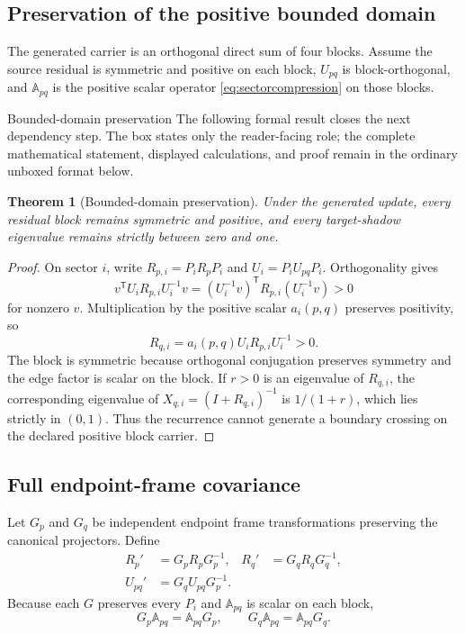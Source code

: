 \documentclass[11pt]{article}
\numberwithin{equation}{section}
\newtheorem{theorem}[definition]{Theorem}
\theoremstyle{remark}
\begin{document}
\subsection{Preservation of the positive bounded domain}
The generated carrier is an orthogonal direct sum of four blocks.  Assume the source residual is symmetric and positive on each block, $U_{pq}$ is block-orthogonal, and $\mathbb A_{pq}$ is the positive scalar operator \eqref{eq:sectorcompression} on those blocks.

\begin{proofguide}{Bounded-domain preservation}
The following formal result closes the next dependency step. The box states only the reader-facing role; the complete mathematical statement, displayed calculations, and proof remain in the ordinary unboxed format below.
\end{proofguide}
\begin{theorem}[Bounded-domain preservation]
Under the generated update, every residual block remains symmetric and positive, and every target-shadow eigenvalue remains strictly between zero and one.
\end{theorem}
\begin{proof}
On sector $i$, write $R_{p,i}=P_iR_pP_i$ and $U_i=P_iU_{pq}P_i$.  Orthogonality gives
\begin{equation}
v^{\mathsf T}U_iR_{p,i}U_i^{-1}v=(U_i^{-1}v)^{\mathsf T}R_{p,i}(U_i^{-1}v)>0
\end{equation}
for nonzero $v$.  Multiplication by the positive scalar $a_i(p,q)$ preserves positivity, so
\begin{equation}
R_{q,i}=a_i(p,q)U_iR_{p,i}U_i^{-1}>0.
\end{equation}
The block is symmetric because orthogonal conjugation preserves symmetry and the edge factor is scalar on the block.  If $r>0$ is an eigenvalue of $R_{q,i}$, the corresponding eigenvalue of $X_{q,i}=(I+R_{q,i})^{-1}$ is $1/(1+r)$, which lies strictly in $(0,1)$.  Thus the recurrence cannot generate a boundary crossing on the declared positive block carrier.
\end{proof}

\subsection{Full endpoint-frame covariance}
Let $G_p$ and $G_q$ be independent endpoint frame transformations preserving the canonical projectors.  Define
\begin{align}
R_p'&=G_pR_pG_p^{-1},&R_q'&=G_qR_qG_q^{-1},\\
U_{pq}'&=G_qU_{pq}G_p^{-1}.&&
\end{align}
Because each $G$ preserves every $P_i$ and $\mathbb A_{pq}$ is scalar on each block,
\begin{equation}
G_p\mathbb A_{pq}=\mathbb A_{pq}G_p,
\qquad
G_q\mathbb A_{pq}=\mathbb A_{pq}G_q.
\label{eq:gaugeedgecommute}
\end{equation}
\end{document}
